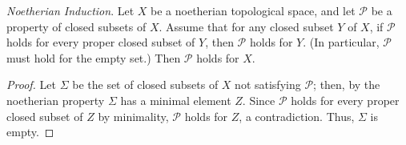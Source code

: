 \documentclass[10pt]{article}
\theoremstyle{definition}
\theoremstyle{remark}
\numberwithin{equation}{section}
\numberwithin{figure}{subsubsection}
\begin{document}
\begin{problem}
  \emph{Noetherian Induction}. Let $X$ be a noetherian topological space, and let $\mathscr{P}$ be a property of closed subsets of $X$. Assume that for any closed subset $Y$ of $X$, if $\mathscr{P}$ holds for every proper closed subset of $Y$, then $\mathscr{P}$ holds for $Y$. (In particular, $\mathscr{P}$ must hold for the empty set.) Then $\mathscr{P}$ holds for $X$.
\end{problem}
\begin{proof}
  Let $\Sigma$ be the set of closed subsets of $X$ not satisfying $\mathscr{P}$; then, by the noetherian property $\Sigma$ has a minimal element $Z$. Since $\mathscr{P}$ holds for every proper closed subset of $Z$ by minimality, $\mathscr{P}$ holds for $Z$, a contradiction. Thus, $\Sigma$ is empty.
\end{proof}
\end{document}
